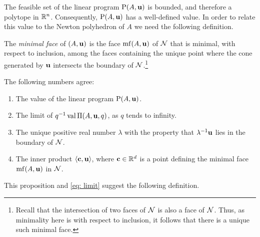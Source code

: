 \documentclass[11pt]{amsart}
\begin{document}
The feasible set of the linear program $\mathrm{P}(A,\mathbf{u})$ is bounded, and therefore a polytope in $\mathbb{R}^n$.
Consequently, $\mathrm{P}(A,\mathbf{u})$ has a well-defined value.
In order to relate this value to the Newton polyhedron of $A$ we need the following definition.

\begin{definition}
   The \emph{minimal face} of $(A, \mathbf{u})$ is the face $\operatorname{mf}(A, \mathbf{u})$ of $\mathcal{N}$ that is minimal, with respect to inclusion, among the faces containing the unique point where the cone generated by $\mathbf{u}$ intersects the boundary of $\mathcal{N}$.\footnote{Recall that the intersection of two faces of $\mathcal{N}$ is also a face of $\mathcal{N}$. Thus, as minimality here is with respect to inclusion, it follows that there is a unique such minimal face.}
\end{definition}

\begin{proposition}
   \label{FT descriptions: P}
   The following numbers agree\textup:
   \begin{enumerate}
      \item\label{value} The value of the linear program $\mathrm{P}(A, \mathbf{u})$.
      \item\label{limit} The limit of $q^{-1}\operatorname{val} \Pi(A,\mathbf{u},q)$, as $q$ tends to infinity. 
      \item\label{lambda} The unique positive real number $\lambda$ with the property that $\lambda^{-1}\mathbf{u}$ lies in the boundary of $\mathcal{N}$.
      \item\label{new ip} The inner product $\langle \mathbf{c}, \mathbf{u} \rangle$, where $\mathbf{c} \in \mathbb{R}^d$ is a point defining the minimal face $\operatorname{mf}(A, \mathbf{u})$ in $\mathcal{N}$.
   \end{enumerate}
\end{proposition}

This proposition and \eqref{eq: limit} suggest the following definition.
\end{document}
